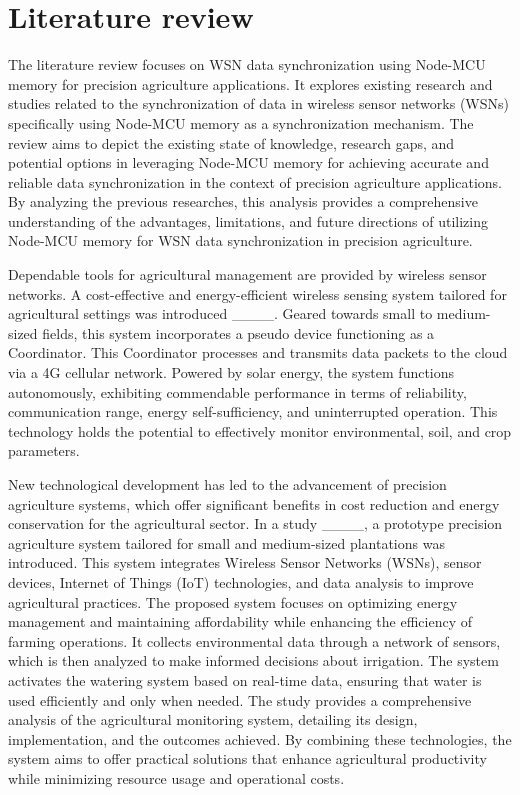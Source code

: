 \section{Literature review}
The literature review focuses on WSN data synchronization using Node-MCU memory for precision agriculture applications. It explores existing research and studies related to the synchronization of data in wireless sensor networks (WSNs) specifically using Node-MCU memory as a synchronization mechanism. The review aims to depict the existing state of knowledge, research gaps, and potential options in leveraging Node-MCU memory for achieving accurate and reliable data synchronization in the context of precision agriculture applications. By analyzing the previous researches, this analysis provides a comprehensive understanding of the advantages, limitations, and future directions of utilizing Node-MCU memory for WSN data synchronization in precision agriculture.

Dependable tools for agricultural management are provided by wireless sensor networks. A cost-effective and energy-efficient wireless sensing system tailored for agricultural settings was introduced ____. Geared towards small to medium-sized fields, this system incorporates a pseudo device functioning as a Coordinator. This Coordinator processes and transmits data packets to the cloud via a 4G cellular network. Powered by solar energy, the system functions autonomously, exhibiting commendable performance in terms of reliability, communication range, energy self-sufficiency, and uninterrupted operation. This technology holds the potential to effectively monitor environmental, soil, and crop parameters.

New technological development has led to the advancement of precision agriculture systems, which offer significant benefits in cost reduction and energy conservation for the agricultural sector. In a study ____, a prototype precision agriculture system tailored for small and medium-sized plantations was introduced. This system integrates Wireless Sensor Networks (WSNs), sensor devices, Internet of Things (IoT) technologies, and data analysis to improve agricultural practices. The proposed system focuses on optimizing energy management and maintaining affordability while enhancing the efficiency of farming operations. It collects environmental data through a network of sensors, which is then analyzed to make informed decisions about irrigation. The system activates the watering system based on real-time data, ensuring that water is used efficiently and only when needed. The study provides a comprehensive analysis of the agricultural monitoring system, detailing its design, implementation, and the outcomes achieved. By combining these technologies, the system aims to offer practical solutions that enhance agricultural productivity while minimizing resource usage and operational costs.

